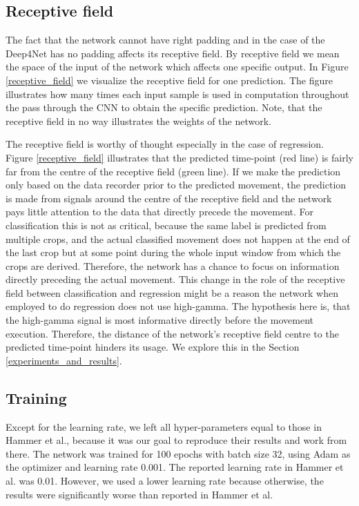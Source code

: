 \subsection{Receptive field}
The fact that the network cannot have right padding and in the case of the Deep4Net has no padding affects its receptive field.
By receptive field we mean the space of the input of the network which affects one specific output.
In Figure \ref{receptive_field} we visualize the receptive field for one prediction.
The figure illustrates how many times each input sample is used in computation throughout the pass through the CNN to obtain the specific prediction.
Note, that the receptive field in no way illustrates the weights of the network.

The receptive field is worthy of thought especially in the case of regression.
Figure \ref{receptive_field} illustrates that the predicted time-point (red line) is fairly far from the centre of the receptive field (green line).
If we make the prediction only based on the data recorder prior to the predicted movement, the prediction is made from signals around the centre of the receptive field and the network pays little attention to the data that directly precede the movement.
For classification this is not as critical, because the same label is predicted from multiple crops, and the actual classified movement does not happen at the end of the last crop but at some point during the whole input window from which the crops are derived.
Therefore, the network has a chance to focus on information directly preceding the actual movement.
This change in the role of the receptive field between classification and regression might be a reason the network when employed to do regression does not use high-gamma.
The hypothesis here is, that the high-gamma signal is most informative directly before the movement execution.
Therefore, the distance of the network's receptive field centre to the predicted time-point hinders its usage.
We explore this in the Section \ref{experiments_and_results}.

\subsection{Training}
Except for the learning rate, we left all hyper-parameters equal to those in Hammer et al., because it was our goal to reproduce their results and work from there.
The network was trained for 100 epochs with batch size 32, using Adam \cite{adam_optimizer} as the optimizer and learning rate 0.001.
The reported learning rate in Hammer et al. was 0.01.
However, we used a lower learning rate because otherwise, the results were significantly worse than reported in Hammer et al.

